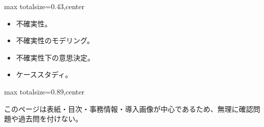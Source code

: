 \clearpage
{}
\begin{minipage}[t]{0.405\textwidth}
\begin{adjustbox}{max totalsize={\textwidth}{0.43\textheight},center}
\begin{minipage}{\textwidth}\scriptsize
{}\begin{itemize}
\item 不確実性。
\item 不確実性のモデリング。
\item 不確実性下の意思決定。
\item ケーススタディ。
\end{itemize}
\end{minipage}
\end{adjustbox}
\end{minipage}\hfill
\begin{minipage}[t]{0.58\textwidth}
\begin{adjustbox}{max totalsize={\textwidth}{0.89\textheight},center}
\begin{minipage}{\textwidth}\scriptsize
{}このページは表紙・目次・事務情報・導入画像が中心であるため、無理に確認問題や過去問を付けない。
\end{minipage}
\end{adjustbox}
\end{minipage}


